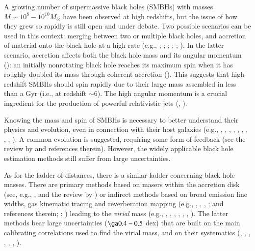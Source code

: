 \documentclass{aa}
\begin{document}
A growing number of supermassive black holes (SMBHs) with masses $M \sim 10^{8}-10^{10} M_{\odot}$ have been observed at high redshifts, but the issue of how they grew so rapidly is still open and under debate. Two possible scenarios can be used in this context: merging between two or multiple black holes, and accretion of material onto the black hole at a high rate (e.g., \citealt{HaiLoe}; \citealt{Yoo}; \citealt{VolRees}; \citealt{LiYetal}; \citealt{Pelup}; \citealt{TanHai}). In the latter scenario, accretion affects both the black hole mass and its angular momentum (\citealt{Bardeen}): an initially nonrotating black hole reaches its maximum spin when it has roughly doubled its mass through coherent accretion (\citealt{Thorn74}). This suggests that high-redshift SMBHs should spin rapidly due to their large mass assembled in less than a Gyr (i.e., at redshift $\sim$6). The high angular momentum is a crucial ingredient for the production of powerful relativistic jets (\citealt{BlandZna}, \citealt{Tchek}).

Knowing the mass and spin of SMBHs is necessary to better understand their physics and evolution, even in connection with their host galaxies (e.g., \citealt{Magor}, \citealt{Gebhar}, \citealt{Ferra}, \citealt{Marconi}, \citealt{Haring}, \citealt{Gultek}, \citealt{Beifiori}, \citealt{Kormen}, \citealt{Mcconn}, \citealt{Reines}). A common evolution is suggested, requiring some form of feedback (see the review by \citealt{Fabian} and references therein). However, the widely applicable black hole estimation methods still suffer from large uncertainties.

As for the ladder of distances, there is a similar ladder concerning black hole masses. There are primary methods based on masers within the accretion disk (see, e.g., \citealt{Greene}, \citealt{Kuo} and the review by \citealt{Tarchi}) or indirect methods based on broad emission line widths, gas kinematic tracing and reverberation mapping (e.g., \citealt{Blandfo}, \citealt{Peterson}, \citealt{PetersonFerr}, \citealt{Onkenetal}; \citealt{FerraFord} and references therein; \citealt{VesterPeter}; \citealt{Bentz}) leading to the {\it virial} mass (e.g., \citealt{Vester}, \citealt{MclureJar}, \citealt{GreenHo}, \citealt{VesterOs}, \citealt{Mcgill}, \citealt{Wangetal}, \citealt{Shenetal11}). The latter methods bear large uncertainties ($\ga 0.4 - 0.5$ dex) that are built on the main calibrating correlations used to find the virial mass, and on their systematics (\citealt{PetersonFerr}, \citealt{Collin}, \citealt{Shenetal}, \citealt{Marconietal}, \citealt{Kelly}, \citealt{ShenKell}, \citealt{Park}).
\end{document}
